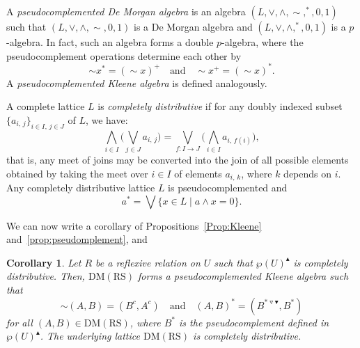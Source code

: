 \documentclass[11pt,a4paper]{amsart}
\newcommand{\UP}{\blacktriangle}
\newcommand{\DOWN}{\blacktriangledown}
\newcommand{\Down}{\triangledown}
\theoremstyle{plain}
\newtheorem{corollary}[theorem]{Corollary}
\theoremstyle{definition}
\theoremstyle{remark}
\numberwithin{equation}{section}
\begin{document}
A \emph{pseudocomplemented De Morgan algebra} is an algebra 
$(L,\vee,\wedge,{\sim},^*,0,1)$ such that $(L,\vee,\wedge,{\sim},0,1)$ is a De Morgan
algebra and $(L,\vee,\wedge,^*,0,1)$ is a $p$-algebra. In fact, such an
algebra forms a double $p$-algebra, where the pseudocomplement operations
determine each other by
\begin{equation}\label{eq:KleeneRule}
{\sim} x^*=({\sim} x)^+ \quad \text{and} \quad {\sim} x^+=({\sim} x)^*.
\end{equation}
A \emph{pseudocomplemented Kleene algebra} is defined analogously.

A complete lattice $L$ is \emph{completely distributive} if for any doubly indexed subset $\{a_{i,\,j}\}_{i \in I, \, j \in J}$ of $L$, we have:
\[
\bigwedge_{i \in I} \Big ( \bigvee_{j \in J} a_{i,\,j} \Big ) = 
\bigvee_{ f \colon I \to J} \Big ( \bigwedge_{i \in I} a_{i, \, f(i) } \Big ), \]
that is, any meet of joins may be converted into the join of all possible elements obtained by taking the meet over $i \in I$ of
elements $a_{i,\,k}$\/, where $k$ depends on $i$. 
Any completely distributive lattice $L$ is pseudocomplemented and
\begin{equation} \label{eq:pseudocomplemented}
a^* = \bigvee \{ x \in L \mid a \wedge x = 0\}.    
\end{equation}




We can now write a corollary of Propositions~\ref{Prop:Kleene} 
and~\ref{prop:pseudomplement},
and~\cite[Proposition~{4.1}]{JarRad25}


\begin{corollary} \label{cor:Kleene_pseudocompl}
Let $R$ be a reflexive relation on $U$ such that 
$\wp(U)^\UP$ is completely distributive. 
Then, $\mathrm{DM(RS)}$ forms a 
pseudocomplemented Kleene algebra such that 
\[{\sim}(A,B) = (B^c,A^c) \quad \text{and} \quad
(A,B)^* = (B^{* \Down \DOWN}, B^*)
\]
for all $(A,B) \in \mathrm{DM(RS)}$, where
$B^*$ is the pseudocomplement defined in $\wp(U)^\UP$. 
The underlying
lattice $\mathrm{DM(RS)}$ is completely distributive.
\end{corollary}
\end{document}
